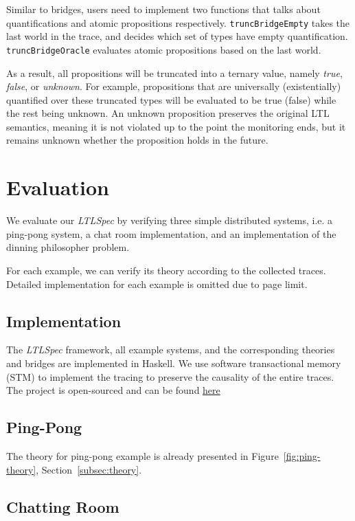 \documentclass[format=acmsmall, nonacm=true, review=true, screen=true]{acmart}
\newcommand{\ltlspec}{\textit{LTLSpec}\xspace}
\begin{document}
Similar to bridges, users need to implement two functions that talks about quantifications and atomic propositions respectively.
\texttt{truncBridgeEmpty} takes the last world in the trace, and decides which set of types have empty quantification.
\texttt{truncBridgeOracle} evaluates atomic propositions based on the last world.

As a result, all propositions will be truncated into a ternary value, namely \textit{true}, \textit{false}, or \textit{unknown}.
For example, propositions that are universally (existentially) quantified over these truncated types will be evaluated to be true (false) while the rest being unknown.
An unknown proposition preserves the original LTL semantics, meaning it is not violated up to the point the monitoring ends, but it remains unknown whether the proposition holds in the future.

\section{Evaluation}

We evaluate our \ltlspec by verifying three simple distributed systems, i.e. a ping-pong system, a chat room implementation, and an implementation of the dinning philosopher problem.

For each example, we can verify its theory according to the collected traces. Detailed implementation for each example is omitted due to page limit.

\subsection{Implementation}

The \ltlspec framework, all example systems, and the corresponding theories and bridges are implemented in Haskell.
We use software transactional memory (STM) to implement the tracing to preserve the causality of the entire traces.
The project is open-sourced and can be found \href{https://github.com/ejconlon/ltlspec}{here}

\subsection{Ping-Pong}

The theory for ping-pong example is already presented in Figure~\ref{fig:ping-theory}, Section~\ref{subsec:theory}.

\subsection{Chatting Room}
\end{document}
